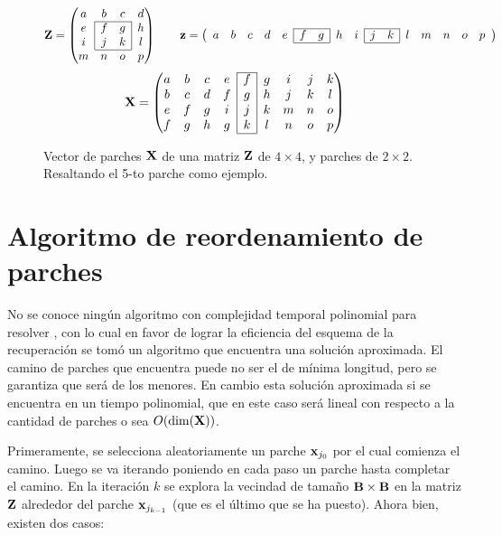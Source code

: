 \begin{figure}[h]
	\[\Z = \left(
		\begin{matrix}
			a & b & c & d\\\cline{2-3}
			e & \multicolumn{1}{|c}{f} & \multicolumn{1}{c|}{g} & h\\
			i & \multicolumn{1}{|c}{j} & \multicolumn{1}{c|}{k} & l\\\cline{2-3}
			m & n & o & p\\
		\end{matrix}
	\right)
	\qquad\z = \left(
		\begin{array}{ccccc|cc|cc|cc|ccccc}
			\cline{6-7}\cline{10-11}
			a & b & c & d & e & f & g & h & i & j & k & l & m & n & o & p \\
			\cline{6-7}\cline{10-11}
		\end{array}
	\right)
	\]
	\[
	\X = \left(
		\begin{matrix}\cline{5-5}
			a & b & c & e & \multicolumn{1}{|c|}{f} & g & i & j & k\\
			b & c & d & f & \multicolumn{1}{|c|}{g} & h & j & k & l\\
			e & f & g & i & \multicolumn{1}{|c|}{j} & k & m & n & o\\
			f & g & h & g & \multicolumn{1}{|c|}{k} & l & n & o & p\\\cline{5-5}
		\end{matrix}
	\right)
	\]
	\caption{Vector de parches $\mathbf{X}$ de una matriz $\mathbf{Z}$ de $4 \times 4$, y parches de $2 \times 2$. Resaltando el 5-to parche como ejemplo.}
	\label{ex:vector_X}
\end{figure}

\section{Algoritmo de reordenamiento de parches}

No se conoce ningún algoritmo con complejidad temporal polinomial para resolver \TSP, con lo cual en favor de lograr la eficiencia del esquema de la recuperaci\'on se tom\'o un algoritmo que encuentra una soluci\'on aproximada. El camino de parches que encuentra puede no ser el de m\'inima longitud, pero se garantiza que ser\'a de los menores. En cambio esta soluci\'on aproximada si se encuentra en un tiempo polinomial, que en este caso ser\'a lineal con respecto a la cantidad de parches o sea $O(\dim(\mathbf{X}))$.

Primeramente, se selecciona aleatoriamente un parche $\mathbf{x}_{j_0}$ por el cual comienza el camino. Luego se va iterando poniendo en cada paso un parche hasta completar el camino. En la iteraci\'on $k$ se explora la vecindad de tamaño $\mathbf{B} \times \mathbf{B}$ en la matriz $\mathbf{Z}$ alrededor del parche $\mathbf{x}_{j_{k - 1}}$ (que es el \'ultimo que se ha puesto). Ahora bien, existen dos casos:

